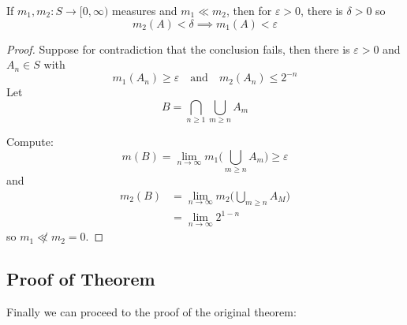 \begin{lemma}
	If $m_1, m_2 : S \to [0, \infty)$ measures and
	 $m_1 \ll m_2$, then for $\varepsilon > 0$, there is $\delta > 0$ so
	 \[
	 	m_2(A) < \delta \implies m_1 (A) < \varepsilon
	 \]
\end{lemma}

\begin{proof}
	Suppose for contradiction that the conclusion fails,
	then there is $\varepsilon > 0 $ and $A_n \in S$ with
	\[
		m_1 (A_{n}) \geq \varepsilon \quad \text{and} \quad m_2 (A_n) \leq 2^{-n}
	\]
	Let
	\[
		B = \bigcap_{n \geq 1} \bigcup_{m \geq n} A_m
	\]

	\noindent Compute:
	\[
		m(B) = \lim_{n \to \infty} m_1 \bigg( \bigcup_{m \geq n} A_m \bigg) \geq \varepsilon
	\] and
	\begin{align*}
		m_2 (B) &= \lim_{n \to \infty} m_2 \bigg(\bigcup_{m \geq n} A_M \bigg) \\
				&= \lim_{n \to \infty} 2^{1 - n}
	\end{align*} so $m_1 \not \ll m_2 = 0$.
\end{proof}

\subsection{Proof of Theorem}

\noindent Finally we can proceed to the proof of the original theorem:


